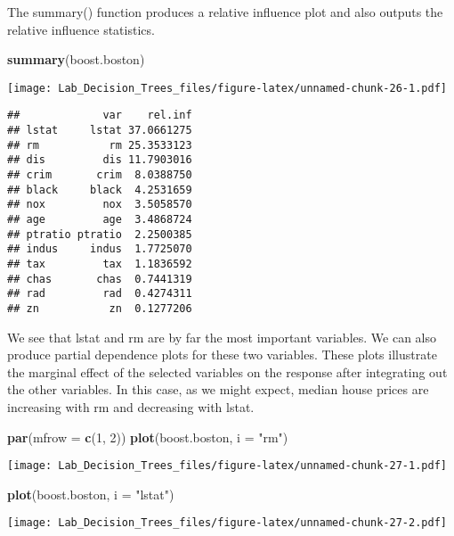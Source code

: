 \documentclass[]{article}
\newenvironment{Shaded}{\begin{snugshade}}{\end{snugshade}}
\newcommand{\KeywordTok}[1]{\textcolor[rgb]{0.13,0.29,0.53}{\textbf{#1}}}
\newcommand{\DataTypeTok}[1]{\textcolor[rgb]{0.13,0.29,0.53}{#1}}
\newcommand{\DecValTok}[1]{\textcolor[rgb]{0.00,0.00,0.81}{#1}}
\newcommand{\StringTok}[1]{\textcolor[rgb]{0.31,0.60,0.02}{#1}}
\newcommand{\NormalTok}[1]{#1}
\begin{document}
The summary() function produces a relative influence plot and also
outputs the relative influence statistics.

\begin{Shaded}
\begin{Highlighting}[]
\KeywordTok{summary}\NormalTok{(boost.boston)}
\end{Highlighting}
\end{Shaded}

\texttt{[image: Lab\_Decision\_Trees\_files/figure-latex/unnamed-chunk-26-1.pdf]}

\begin{verbatim}
##             var    rel.inf
## lstat     lstat 37.0661275
## rm           rm 25.3533123
## dis         dis 11.7903016
## crim       crim  8.0388750
## black     black  4.2531659
## nox         nox  3.5058570
## age         age  3.4868724
## ptratio ptratio  2.2500385
## indus     indus  1.7725070
## tax         tax  1.1836592
## chas       chas  0.7441319
## rad         rad  0.4274311
## zn           zn  0.1277206
\end{verbatim}

We see that lstat and rm are by far the most important variables. We can
also produce partial dependence plots for these two variables. These
plots illustrate the marginal effect of the selected variables on the
response after integrating out the other variables. In this case, as we
might expect, median house prices are increasing with rm and decreasing
with lstat.

\begin{Shaded}
\begin{Highlighting}[]
\KeywordTok{par}\NormalTok{(}\DataTypeTok{mfrow =} \KeywordTok{c}\NormalTok{(}\DecValTok{1}\NormalTok{, }\DecValTok{2}\NormalTok{)) }
\KeywordTok{plot}\NormalTok{(boost.boston, }\DataTypeTok{i =} \StringTok{"rm"}\NormalTok{) }
\end{Highlighting}
\end{Shaded}

\texttt{[image: Lab\_Decision\_Trees\_files/figure-latex/unnamed-chunk-27-1.pdf]}

\begin{Shaded}
\begin{Highlighting}[]
\KeywordTok{plot}\NormalTok{(boost.boston, }\DataTypeTok{i =} \StringTok{"lstat"}\NormalTok{)}
\end{Highlighting}
\end{Shaded}

\texttt{[image: Lab\_Decision\_Trees\_files/figure-latex/unnamed-chunk-27-2.pdf]}
\end{document}
